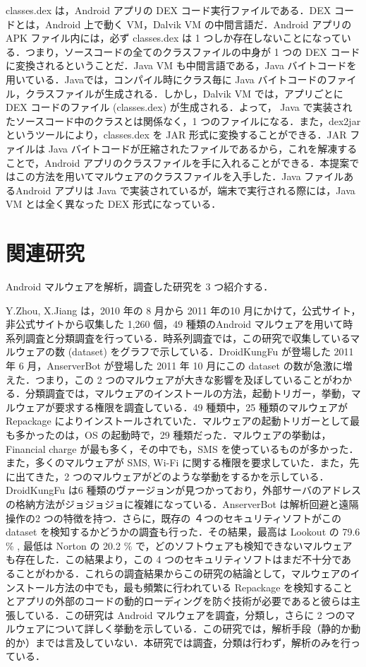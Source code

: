 \documentclass[12pt]{jsarticle}
\begin{document}
classes.dex は，Android アプリの DEX コード実行ファイルである．DEX コードとは，Android 上で動く VM，Dalvik VM の中間言語だ．Android アプリの APK ファイル内には，必ず classes.dex は 1 つしか存在しないことになっている．つまり，ソースコードの全てのクラスファイルの中身が 1 つの DEX コードに変換されるということだ．Java VM も中間言語である，Java バイトコードを用いている．Javaでは，コンパイル時にクラス毎に Java バイトコードのファイル，クラスファイルが生成される．しかし，Dalvik VM では，アプリごとに DEX コードのファイル (classes.dex) が生成される．よって， Java で実装されたソースコード中のクラスとは関係なく，1 つのファイルになる．また，dex2jar \cite{d2jar} というツールにより，classes.dex を JAR 形式に変換することができる．JAR ファイルは Java バイトコードが圧縮されたファイルであるから，これを解凍することで，Android アプリのクラスファイルを手に入れることができる．本提案ではこの方法を用いてマルウェアのクラスファイルを入手した．Java ファイルあるAndroid アプリは Java で実装されているが，端末で実行される際には，Java VM とは全く異なった DEX 形式になっている．


\newpage
\section{関連研究}
 Android マルウェアを解析，調査した研究を 3 つ紹介する．

Y.Zhou, X.Jiang は，2010 年の 8 月から 2011 年の10 月にかけて，公式サイト，非公式サイトから収集した 1,260 個，49 種類のAndroid マルウェアを用いて時系列調査と分類調査を行っている．時系列調査では，この研究で収集しているマルウェアの数 (dataset) をグラフで示している．DroidKungFu が登場した 2011 年 6 月，AnserverBot が登場した 2011 年 10 月にこの dataset の数が急激に増えた．つまり，この 2 つのマルウェアが大きな影響を及ぼしていることがわかる．分類調査では，マルウェアのインストールの方法，起動トリガー，挙動，マルウェアが要求する権限を調査している．49 種類中，25 種類のマルウェアが Repackage によりインストールされていた．マルウェアの起動トリガーとして最も多かったのは，OS の起動時で，29 種類だった．マルウェアの挙動は，Financial charge が最も多く，その中でも，SMS を使っているものが多かった．また，多くのマルウェアが SMS, Wi-Fi に関する権限を要求していた．また，先に出てきた，2 つのマルウェアがどのような挙動をするかを示している．DroidKungFu は6 種類のヴァージョンが見つかっており，外部サーバのアドレスの格納方法がジョジョジョに複雑になっている．AnserverBot は解析回避と遠隔操作の2 つの特徴を持つ．さらに，既存の ４つのセキュリティソフトがこの  dataset を検知するかどうかの調査も行った．その結果，最高は Lookout の 79.6 \% , 最低は Norton の 20.2 \% で，どのソフトウェアも検知できないマルウェアも存在した．この結果より，この 4 つのセキュリティソフトはまだ不十分であることがわかる．これらの調査結果からこの研究の結論として，マルウェアのインストール方法の中でも，最も頻繁に行われている Repackage を検知することとアプリの外部のコードの動的ローディングを防ぐ技術が必要であると彼らは主張している．この研究は Android マルウェアを調査，分類し，さらに 2 つのマルウェアについて詳しく挙動を示している．この研究では，解析手段（静的か動的か）までは言及していない．本研究では調査，分類は行わず，解析のみを行っている．
\end{document}
